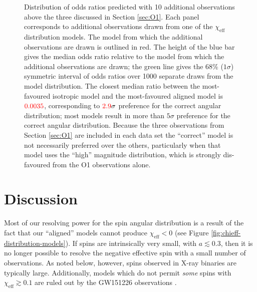 \documentclass[modern,linenumbers]{aastex61}
\newcommand{\chieff}{\chi_\mathrm{eff}}
\newcommand{\checkme}[1]{\textcolor{red}{#1}}
\newcommand{\OTwoSigmaIsoAlignedMin}{\checkme{2.9}}
\newcommand{\OTwoOddsIsoAlignedMin}{\checkme{0.0035}}
\begin{document}
\begin{figure}
  \caption{\label{fig:O2-predictions} Distribution of odds ratios
    predicted with 10 additional observations above the three
    discussed in Section \ref{sec:O1}.  Each panel corresponds to
    additional observations drawn from one of the $\chieff$
    distribution models.  The model from which the additional
    observations are drawn is outlined in red.  The height of the blue
    bar gives the median odds ratio relative to the model from which
    the additional observations are drawn; the green line gives the
    68\% ($1 \sigma$) symmetric interval of odds ratios over 1000
    separate draws from the model distribution.  The closest median
    ratio between the most-favoured isotropic model and the
    most-favoured aligned model is $\OTwoOddsIsoAlignedMin$,
    corresponding to $\OTwoSigmaIsoAlignedMin\sigma$ preference for
    the correct angular distribution; most models result in more than
    $5\sigma$ preference for the correct angular distribution.
    Because the three observations from Section \ref{sec:O1} are
    included in each data set the ``correct'' model is not necessarily
    preferred over the others, particularly when that model uses the
    ``high'' magnitude distribution, which is strongly dis-favoured
    from the O1 observations alone.}
\end{figure}

\section{Discussion}
\label{sec:discussion}

Most of our resolving power for the spin angular distribution is a
result of the fact that our ``aligned'' models cannot produce
$\chieff < 0$ (see Figure \ref{fig:chieff-distribution-models}).  If
spins are intrinsically very small, with $a \lesssim 0.3$, then it is
no longer possible to resolve the negative effective spin with a small
number of observations.  As noted below, however, spins observed in
X-ray binaries are typically large.  Additionally, models which do not
permit \emph{some} spins with $\chieff \gtrsim 0.1$ are ruled out by
the GW151226 observations \citep{2016PhRvL.116x1103A}.
\end{document}
